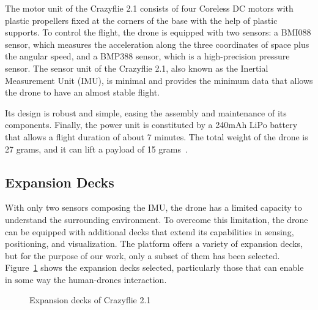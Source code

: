 The motor unit of the Crazyflie 2.1 consists of four Coreless DC motors with plastic propellers fixed at the corners of the base with the help of plastic supports.
To control the flight, the drone is equipped with two sensors: a BMI088 sensor, which measures the acceleration along the three coordinates of space plus the angular speed, 
and a BMP388 sensor, which is a high-precision pressure sensor.
The sensor unit of the Crazyflie 2.1, also known as the Inertial Measurement Unit (IMU), is minimal and provides the minimum data that allows the drone to have an almost stable flight.

Its design is robust and simple, easing the assembly and maintenance of its components.
Finally, the power unit is constituted by a 240mAh LiPo battery that allows a flight duration of about 7 minutes. 
The total weight of the drone is 27 grams, and it can lift a payload of 15 grams~\cite{crazyflie}. 


\subsection{Expansion Decks}\label{subsec:expansion_decks}
With only two sensors composing the IMU, the drone has a limited capacity to understand the surrounding environment. 
To overcome this limitation, the drone can be equipped with additional decks that extend its capabilities in sensing, positioning, and visualization.
The platform offers a variety of expansion decks, but for the purpose of our work, only a subset of them has been selected.
Figure~\ref{fig:decks} shows the expansion decks selected, particularly those that can enable in some way the human-drones interaction.

\begin{figure}[h]
    \centering
    \quad
    \quad
    \quad
    \quad
    \caption{Expansion decks of Crazyflie 2.1}\label{fig:decks}
\end{figure}


